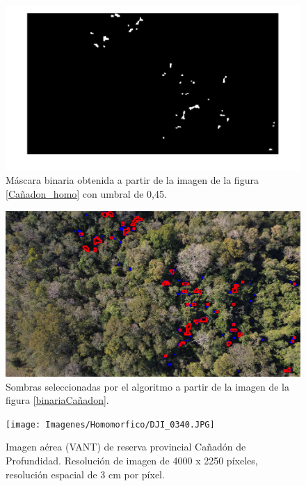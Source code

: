 \begin{figure}[h!]
    \includegraphics[width=\textwidth]{Imagenes/Homomorfico/DJI_240_sel.png}
     \hfill
     \caption{Máscara binaria obtenida a partir de la imagen de la figura \ref{Cañadon_homo} con umbral de 0,45.}
    \label{seleccionadaDJI240}
\end{figure}

\begin{figure}[h!]
    \includegraphics[width=\textwidth]{Imagenes/Homomorfico/dji_240_seleccionadas.png}
     \hfill
     \caption{Sombras seleccionadas por el algoritmo a partir de la imagen de la figura \ref{binariaCañadon}.}
    \label{mascaraCañadon}
\end{figure}

\begin{figure}[h!]
    \texttt{[image: Imagenes/Homomorfico/DJI\_0340.JPG]}
     \hfill
     \caption{Imagen aérea (VANT) de reserva provincial Cañadón de Profundidad. Resolución de imagen de 4000 x 2250 píxeles, resolución espacial de 3 cm por píxel.}
    \label{Cañadon_homo2}
\end{figure}

